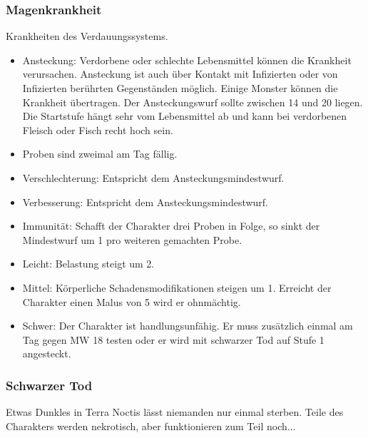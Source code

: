 \documentclass{article}
\begin{document}
\subsubsection{Magenkrankheit}

Krankheiten des Verdauungssystems. 

\begin{itemize}
\item Ansteckung: Verdorbene oder schlechte Lebensmittel können die Krankheit verursachen. Ansteckung ist auch über Kontakt mit Infizierten oder von Infizierten berührten Gegenständen möglich. Einige Monster können die Krankheit übertragen. Der Ansteckungswurf sollte zwischen 14 und 20 liegen. Die Startstufe hängt sehr vom Lebensmittel ab und kann bei verdorbenen Fleisch oder Fisch recht hoch sein.
\item Proben sind zweimal am Tag fällig.
\item Verschlechterung: Entspricht dem Ansteckungsmindestwurf.
\item Verbesserung: Entspricht dem Ansteckungsmindestwurf.
\item Immunität: Schafft der Charakter drei Proben in Folge, so sinkt der Mindestwurf um 1 pro weiteren gemachten Probe.
\item Leicht: Belastung steigt um 2.
\item Mittel: Körperliche Schadensmodifikationen steigen um 1. Erreicht der Charakter einen Malus von 5 wird er ohnmächtig.
\item Schwer: Der Charakter ist handlungsunfähig. Er muss zusätzlich einmal am Tag gegen MW 18 testen oder er wird mit schwarzer Tod auf Stufe 1 angesteckt.
\end{itemize}

\subsubsection{Schwarzer Tod}

Etwas Dunkles in Terra Noctis lässt niemanden nur einmal sterben. Teile des Charakters werden nekrotisch, aber
funktionieren zum Teil noch...
\end{document}
